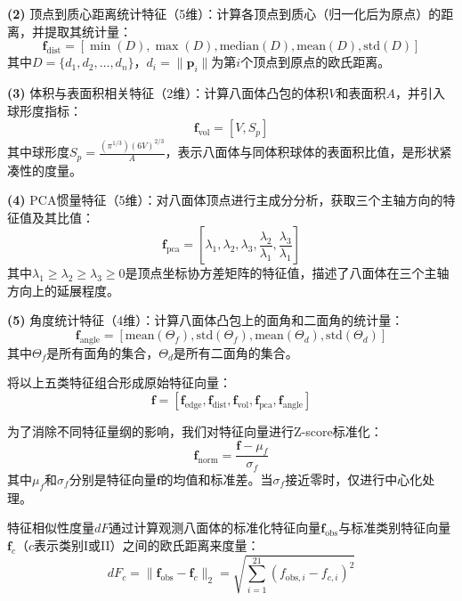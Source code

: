 \textbf{(2)} 顶点到质心距离统计特征（5维）：计算各顶点到质心（归一化后为原点）的距离，并提取其统计量：
\begin{equation}
\mathbf{f}_{\text{dist}} = [\min(D), \max(D), \text{median}(D), \text{mean}(D), \text{std}(D)]
\end{equation}
其中$D = \{d_1, d_2, \ldots, d_n\}$，$d_i = \|\mathbf{p}_i\|$为第$i$个顶点到原点的欧氏距离。

\textbf{(3)} 体积与表面积相关特征（2维）：计算八面体凸包的体积$V$和表面积$A$，并引入球形度指标：
\begin{equation}
\mathbf{f}_{\text{vol}} = [V, S_p]
\end{equation}
其中球形度$S_p = \frac{(\pi^{1/3})(6V)^{2/3}}{A}$，表示八面体与同体积球体的表面积比值，是形状紧凑性的度量。

\textbf{(4)} PCA惯量特征（5维）：对八面体顶点进行主成分分析，获取三个主轴方向的特征值及其比值：
\begin{equation}
\mathbf{f}_{\text{pca}} = [\lambda_1, \lambda_2, \lambda_3, \frac{\lambda_2}{\lambda_1}, \frac{\lambda_3}{\lambda_1}]
\end{equation}
其中$\lambda_1 \geq \lambda_2 \geq \lambda_3 \geq 0$是顶点坐标协方差矩阵的特征值，描述了八面体在三个主轴方向上的延展程度。

\textbf{(5)} 角度统计特征（4维）：计算八面体凸包上的面角和二面角的统计量：
\begin{equation}
\mathbf{f}_{\text{angle}} = [\text{mean}(\Theta_f), \text{std}(\Theta_f), \text{mean}(\Theta_d), \text{std}(\Theta_d)]
\end{equation}
其中$\Theta_f$是所有面角的集合，$\Theta_d$是所有二面角的集合。

将以上五类特征组合形成原始特征向量：
\begin{equation}
\mathbf{f} = [\mathbf{f}_{\text{edge}}, \mathbf{f}_{\text{dist}}, \mathbf{f}_{\text{vol}}, \mathbf{f}_{\text{pca}}, \mathbf{f}_{\text{angle}}]
\end{equation}

为了消除不同特征量纲的影响，我们对特征向量进行Z-score标准化：
    \begin{equation}
\mathbf{f}_{\text{norm}} = \frac{\mathbf{f} - \mu_f}{\sigma_f}
    \end{equation}
其中$\mu_f$和$\sigma_f$分别是特征向量$\mathbf{f}$的均值和标准差。当$\sigma_f$接近零时，仅进行中心化处理。

特征相似性度量$dF$通过计算观测八面体的标准化特征向量$\mathbf{f}_{\text{obs}}$与标准类别特征向量$\mathbf{f}_{c}$（$c$表示类别I或II）之间的欧氏距离来度量：
\begin{equation}
dF_c = \|\mathbf{f}_{\text{obs}} - \mathbf{f}_{c}\|_2 = \sqrt{\sum_{i=1}^{21}(f_{\text{obs},i} - f_{c,i})^2}
\end{equation}

